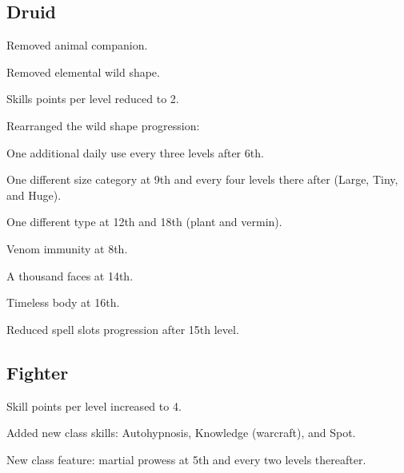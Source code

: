 \subsection{Druid}
\begin{itemize*}
\item Removed animal companion.%
\item Removed elemental wild shape.
\item Skills points per level reduced to 2.
\item Rearranged the wild shape progression:
	\begin{itemize*}
	 	\item One additional daily use every three levels after 6th.
	 	\item One different size category at 9th and every four levels there after (Large, Tiny, and Huge).
	 	\item One different type at 12th and 18th (plant and vermin).
 	\end{itemize*}
\item Venom immunity at 8th.
\item A thousand faces at 14th.
\item Timeless body at 16th.
\item Reduced spell slots progression after 15th level.
\end{itemize*}

\subsection{Fighter}
\begin{itemize*}
\item Skill points per level increased to 4.
\item Added new class skills: Autohypnosis, Knowledge (warcraft), and Spot.
\item New class feature: martial prowess at 5th and every two levels thereafter.
\end{itemize*}

